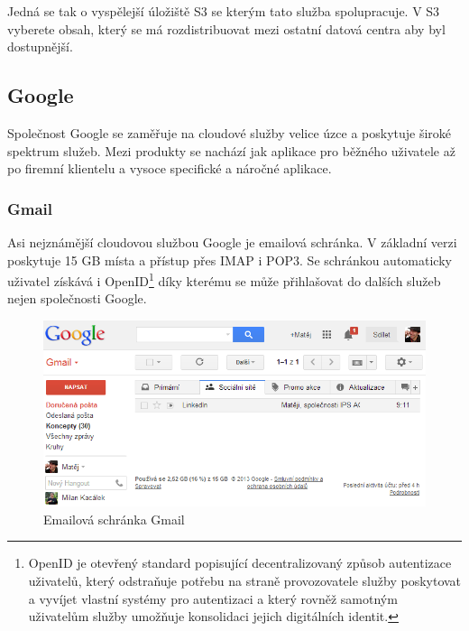 Jedná se tak o vyspělejší úložiště S3 se kterým tato služba spolupracuje. V S3 vyberete obsah, který se má rozdistribuovat mezi ostatní datová centra aby byl dostupnější.

\subsection{Google}
Společnost Google se zaměřuje na cloudové služby velice úzce a poskytuje široké spektrum služeb. Mezi produkty se nachází jak aplikace pro běžného uživatele až po firemní klientelu a vysoce specifické a náročné aplikace.

\subsubsection{Gmail}
Asi nejznámější cloudovou službou Google je emailová schránka. V základní verzi poskytuje 15 GB místa a přístup přes IMAP i POP3. Se schránkou automaticky uživatel získává i OpenID\footnote{OpenID je otevřený standard popisující decentralizovaný způsob autentizace uživatelů, který odstraňuje potřebu na straně provozovatele služby poskytovat a vyvíjet vlastní systémy pro autentizaci a který rovněž samotným uživatelům služby umožňuje konsolidaci jejich digitálních identit.\cite{wiki:openID}} díky kterému se může přihlašovat do dalších služeb nejen společnosti Google.
\begin{figure}[htbp]
	\centering
		\includegraphics[width=1.00\textwidth]{ext/googleGmail.png}
	\caption{Emailová schránka Gmail}
	\label{fig:googleGmail}
\end{figure}

